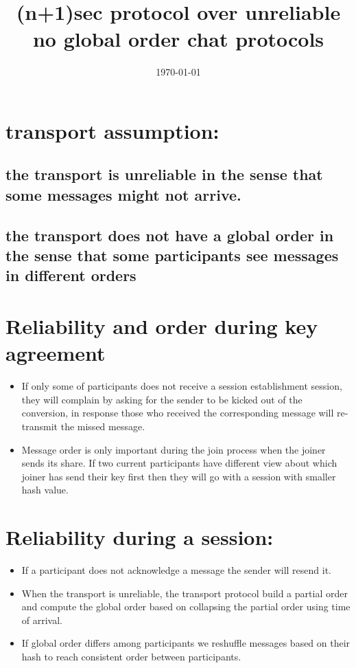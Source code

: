 \documentclass[11pt]{article}
\date{\today}
\title{(n+1)sec protocol over unreliable no global order chat protocols}
\begin{document}
\maketitle
\tableofcontents

\section{transport assumption:}
\label{sec-1}
\subsection{the transport is unreliable in the sense that some messages might not arrive.}
\label{sec-1-1}
\subsection{the transport does not have a global order in the sense that some participants see messages in different orders}
\label{sec-1-2}

\section{Reliability and order during key agreement}
\label{sec-2}
\begin{itemize}
\item If only some of  participants does not receive a session establishment session, they will complain by asking for the sender to be kicked out of the conversion, in response those who received the corresponding message will re-transmit the missed message.
\item Message order is only important during the join process when the joiner sends its share. If two current participants have different view about which joiner has send their key first then they will go with a session with smaller hash value.
\end{itemize}

\section{Reliability during a session:}
\label{sec-3}
\begin{itemize}
\item If a participant does not acknowledge a message the sender will resend it.
\item When the transport is unreliable, the transport protocol build a partial order and compute the global order based on collapsing the partial order using time of arrival.
\item If global order differs among participants we reshuffle messages based on their hash to reach consistent order between participants.
\end{itemize}
\end{document}
